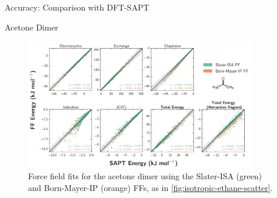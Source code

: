 \begin{subsection}{Accuracy: Comparison with DFT-SAPT}
\begin{subsubsection}{Acetone Dimer}
    \begin{figure}
    \includegraphics[width=0.9\textwidth]{isotropic/acetone_acetone_scatter.pdf}
    \caption{
    Force field fits for the acetone dimer using the Slater-ISA (green) and
    Born-Mayer-IP (orange) FFs, as in \cref{fig:isotropic-ethane-scatter}.
            }
    \label{fig:isotropic-acetone-scatter}
    \end{figure}



\end{subsubsection}
\end{subsection}
